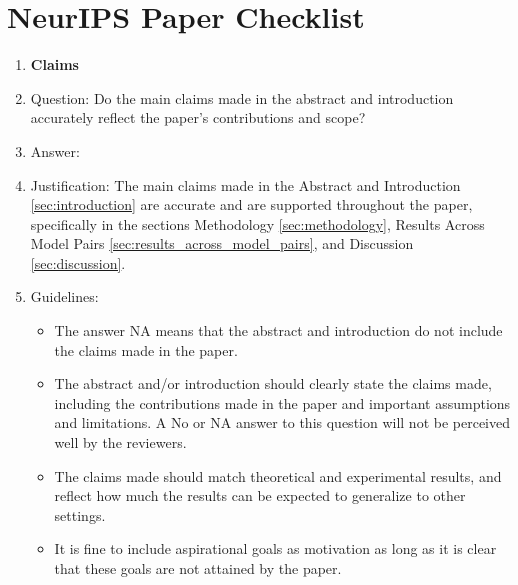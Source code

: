 \documentclass{article}
\begin{document}
\newpage
\section*{NeurIPS Paper Checklist}

\begin{enumerate}

\item {\bf Claims}
    \item[] Question: Do the main claims made in the abstract and introduction accurately reflect the paper's contributions and scope?
    \item[] Answer: \answerYes{} %
    \item[] Justification: The main claims made in the Abstract and Introduction \ref{sec:introduction} are accurate and are supported throughout the paper, specifically in the sections Methodology \ref{sec:methodology}, Results Across Model Pairs \ref{sec:results_across_model_pairs}, and Discussion \ref{sec:discussion}. 
    \item[] Guidelines:
    \begin{itemize}
        \item The answer NA means that the abstract and introduction do not include the claims made in the paper.
        \item The abstract and/or introduction should clearly state the claims made, including the contributions made in the paper and important assumptions and limitations. A No or NA answer to this question will not be perceived well by the reviewers. 
        \item The claims made should match theoretical and experimental results, and reflect how much the results can be expected to generalize to other settings. 
        \item It is fine to include aspirational goals as motivation as long as it is clear that these goals are not attained by the paper. 
    \end{itemize}


\end{enumerate}
\end{document}
